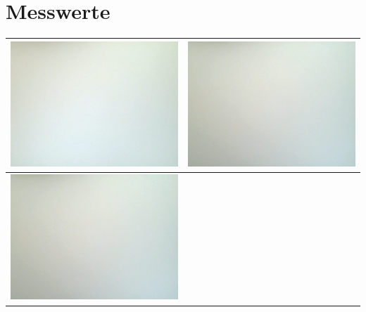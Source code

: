 \section{Messwerte}
\label{chap:VERSUCH_3_MESSWERTE}

\begin{tabular}{|c|c|}
\hline 
\includegraphics[scale=0.27]{weissbilder/weissbild_0.png}
 & 
\includegraphics[scale=0.27]{weissbilder/weissbild_1.png}
 \\ 
\hline 
\includegraphics[scale=0.27]{weissbilder/weissbild_2.png}

\end{tabular}
